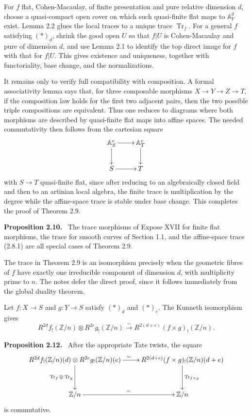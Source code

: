 \documentclass[12pt]{article}
\newcommand{\Zz}{\mathbb Z}
\newenvironment{statement}[1]{\par\medskip\noindent\textbf{#1.}\ }{\par\medskip}
\begin{document}
For \(f\) flat, Cohen-Macaulay, of finite presentation and pure relative dimension \(d\), choose a quasi-compact open cover on which such quasi-finite flat maps to \(\mathbb A^d_Y\) exist. Lemma 2.2 glues the local traces to a unique trace \(\operatorname{Tr}_f\). For a general \(f\) satisfying \((*)_d\), shrink the good open \(U\) so that \(f|U\) is Cohen-Macaulay and pure of dimension \(d\), and use Lemma 2.1 to identify the top direct image for \(f\) with that for \(f|U\). This gives existence and uniqueness, together with functoriality, base change, and the normalizations.

It remains only to verify full compatibility with composition. A formal associativity lemma says that, for three composable morphisms \(X\to Y\to Z\to T\), if the composition law holds for the first two adjacent pairs, then the two possible triple compositions are equivalent. Thus one reduces to diagrams where both morphisms are described by quasi-finite flat maps into affine spaces. The needed commutativity then follows from the cartesian square
\[
\xymatrix{
\mathbb A^e_S\ar[r]\ar[d]&\mathbb A^e_T\ar[d]\\
S\ar[r]&T
}
\]
with \(S\to T\) quasi-finite flat, since after reducing to an algebraically closed field and then to an artinian local algebra, the finite trace is multiplication by the degree while the affine-space trace is stable under base change. This completes the proof of Theorem 2.9.

\begin{statement}{Proposition 2.10}
The trace morphisms of Expose XVII for finite flat morphisms, the trace for smooth curves of Section 1.1, and the affine-space trace (2.8.1) are all special cases of Theorem 2.9.
\end{statement}

The trace in Theorem 2.9 is an isomorphism precisely when the geometric fibres of \(f\) have exactly one irreducible component of dimension \(d\), with multiplicity prime to \(n\). The notes defer the direct proof, since it follows immediately from the global duality theorem.

Let \(f:X\to S\) and \(g:Y\to S\) satisfy \((*)_d\) and \((*)_e\). The Kunneth isomorphism gives
\[
R^{2d}f_!(\Zz/n)\otimes R^{2e}g_!(\Zz/n)
\xrightarrow{\sim}
R^{2(d+e)}(f\times g)_!(\Zz/n).
\tag{2.11.1}
\]

\begin{statement}{Proposition 2.12}
After the appropriate Tate twists, the square
\[
\xymatrix@R=1.2cm{
R^{2d}f_!(\Zz/n)(d)\otimes R^{2e}g_!(\Zz/n)(e)\ar[r]^{\sim}\ar[d]_{\operatorname{Tr}_f\otimes\operatorname{Tr}_g}&
R^{2(d+e)}(f\times g)_!(\Zz/n)(d+e)\ar[d]^{\operatorname{Tr}_{f\times g}}\\
\Zz/n\ar[r]^{=}&\Zz/n
}
\]
is commutative.
\end{statement}
\end{document}

